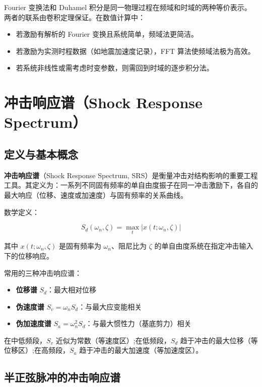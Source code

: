 Fourier 变换法和 Duhamel 积分是同一物理过程在频域和时域的两种等价表示。两者的联系由卷积定理保证。在数值计算中：
\begin{itemize}
\item 若激励有解析的 Fourier 变换且系统简单，频域法更简洁。
\item 若激励为实测时程数据（如地震加速度记录），FFT 算法使频域法极为高效。
\item 若系统非线性或需考虑时变参数，则需回到时域的逐步积分法。
\end{itemize}

\section{冲击响应谱（Shock Response Spectrum）}

\subsection{定义与基本概念}

\textbf{冲击响应谱}（Shock Response Spectrum, SRS）是衡量冲击对结构影响的重要工程工具。其定义为：一系列不同固有频率的单自由度振子在同一冲击激励下，各自的最大响应（位移、速度或加速度）与固有频率的关系曲线。

数学定义：

\begin{myformula}
\[
S_d(\omega_n, \zeta) = \max_{t} |x(t; \omega_n, \zeta)|
\]
\end{myformula}

其中 $x(t; \omega_n, \zeta)$ 是固有频率为 $\omega_n$、阻尼比为 $\zeta$ 的单自由度系统在指定冲击输入下的位移响应。

常用的三种冲击响应谱：
\begin{itemize}
\item \textbf{位移谱} $S_d$：最大相对位移
\item \textbf{伪速度谱} $S_v = \omega_n S_d$：与最大应变能相关
\item \textbf{伪加速度谱} $S_a = \omega_n^2 S_d$：与最大惯性力（基底剪力）相关
\end{itemize}

在中低频段，$S_v$ 近似为常数（等速度区）;在低频段，$S_d$ 趋于冲击的最大位移（等位移区）;在高频段，$S_a$ 趋于冲击的最大加速度（等加速度区）。

\subsection{半正弦脉冲的冲击响应谱}

